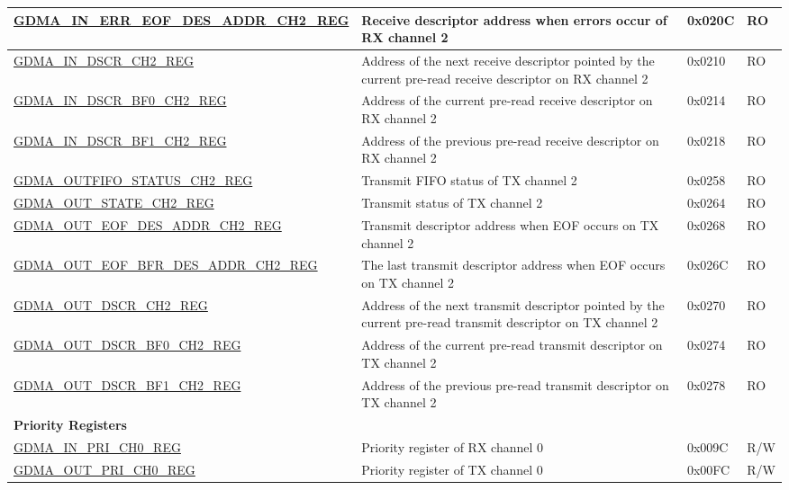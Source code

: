 \begin{longtable}{ | p{6.7cm} | p{6cm} | p{1.3cm} | p{1.5cm} | }
\hyperref[regdesc:GDMAINERREOFDESADDRCHNREG]{GDMA\_IN\_ERR\_EOF\_DES\_ADDR\_CH2\_REG} & Receive descriptor address when errors occur of RX channel 2 & 0x020C & RO \\ \hline
\hyperref[regdesc:GDMAINDSCRCHNREG]{GDMA\_IN\_DSCR\_CH2\_REG} & Address of the next receive descriptor pointed by the current pre-read receive descriptor on RX channel 2 & 0x0210 & RO \\ \hline
\hyperref[regdesc:GDMAINDSCRBF0CHNREG]{GDMA\_IN\_DSCR\_BF0\_CH2\_REG} & Address of the current pre-read receive descriptor on RX channel 2 & 0x0214 & RO \\ \hline
\hyperref[regdesc:GDMAINDSCRBF1CHNREG]{GDMA\_IN\_DSCR\_BF1\_CH2\_REG} & Address of the previous pre-read receive descriptor on RX channel 2 & 0x0218 & RO \\ \hline
\hyperref[regdesc:GDMAOUTFIFOSTATUSCHNREG]{GDMA\_OUTFIFO\_STATUS\_CH2\_REG} & Transmit FIFO status of TX channel 2 & 0x0258 & RO \\ \hline
\hyperref[regdesc:GDMAOUTSTATECHNREG]{GDMA\_OUT\_STATE\_CH2\_REG} & Transmit status of TX channel 2 & 0x0264 & RO \\ \hline
\hyperref[regdesc:GDMAOUTEOFDESADDRCHNREG]{GDMA\_OUT\_EOF\_DES\_ADDR\_CH2\_REG} & Transmit descriptor address when EOF occurs on TX channel 2 & 0x0268 & RO \\ \hline
\hyperref[regdesc:GDMAOUTEOFBFRDESADDRCHNREG]{GDMA\_OUT\_EOF\_BFR\_DES\_ADDR\_CH2\newline\_REG} & The last transmit descriptor address when EOF occurs on TX channel 2 & 0x026C & RO \\ \hline
\hyperref[regdesc:GDMAOUTDSCRCHNREG]{GDMA\_OUT\_DSCR\_CH2\_REG} & Address of the next transmit descriptor pointed by the current pre-read transmit descriptor on TX channel 2 & 0x0270 & RO \\ \hline
\hyperref[regdesc:GDMAOUTDSCRBF0CHNREG]{GDMA\_OUT\_DSCR\_BF0\_CH2\_REG} & Address of the current pre-read transmit descriptor on TX channel 2 & 0x0274 & RO \\ \hline
\hyperref[regdesc:GDMAOUTDSCRBF1CHNREG]{GDMA\_OUT\_DSCR\_BF1\_CH2\_REG} & Address of the previous pre-read transmit descriptor on TX channel 2 & 0x0278 & RO \\ \hline
\multicolumn{4}{|l|}{\textbf{Priority Registers}} \\ \hline
\hyperref[regdesc:GDMAINPRICHNREG]{GDMA\_IN\_PRI\_CH0\_REG} & Priority register of RX channel 0 & 0x009C & R/W \\ \hline
\hyperref[regdesc:GDMAOUTPRICHNREG]{GDMA\_OUT\_PRI\_CH0\_REG} & Priority register of TX channel 0 & 0x00FC & R/W \\ \hline

\end{longtable}
